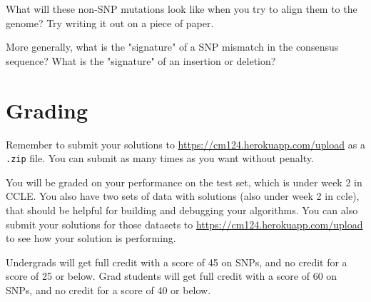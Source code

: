 \documentclass{article}
\begin{document}
What will these non-SNP mutations look like when you try to align them to the genome? Try writing it out on a piece of paper. 

More generally, what is the "signature" of a SNP mismatch in the consensus sequence?  What is the "signature" of an insertion or deletion?




\section*{Grading}

Remember to submit your solutions to \url{https://cm124.herokuapp.com/upload} as a \verb|.zip| file. You can submit as many times as you want without penalty.

You will be graded on your performance on the test set, which is under week 2 in CCLE. You also have two sets of data with solutions (also under week 2 in ccle), that should be helpful for building and debugging your algorithms. You can also submit your solutions for those datasets to \url{https://cm124.herokuapp.com/upload} to see how your solution is performing.

Undergrads will get full credit with a score of 45 on SNPs, and no credit for a score of 25 or below.  Grad students will get full credit with a score of 60 on SNPs, and no credit for a score of 40 or below.
\end{document}
